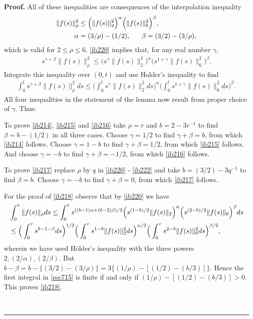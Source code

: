 \documentclass[12pt]{article}
\newenvironment{proof}[1][Proof]{\textbf{#1.} }{\ \rule{0.5em}{0.5em}}
\def \({\Big(}
\def \){\Big)}
\def \eref{\eqref}
\numberwithin{equation}{section}
\begin{document}
\begin{proof}All of these inequalities  are consequences of the interpolation inequality
\begin{align}
&\|f(s)\|_\rho^2  \le \Big(\|f(s)\|_2^2\Big)^\alpha \Big(\| f(s)\|_6^2\Big)^{\beta},  \label{ib220} \\
           &\ \ \ \ \ \ \ \ \alpha = (3/\rho) - (1/2),\ \ \ \ \  \beta = (3/2) - (3/\rho),            \notag
\end{align}
which is valid for $2 \le \rho \le 6$.
\eref{ib220} implies that, for any real number $\gamma$,
\begin{align}
s^{\gamma + \beta} \|f(s)\|_\rho^2 
\le  \Big(s^{\gamma}\|f(s)\|_2^2\Big)^\alpha 
                     \Big(s^{1+\gamma}\| f(s)\|_6^2\Big)^{\beta}.                               \label{ib221}
\end{align}
Integrate this inequality over $(0,t)$ and use Holder's inequality to find
\begin{align}
\int_0^t s^{\gamma + \beta} \|f(s)\|_\rho^2 ds
\le  \Big(\int_0^t s^{\gamma}\|f(s)\|_2^2ds\Big)^\alpha 
               \Big(\int_0^ts^{1+\gamma}\| f(s)\|_6^2ds\Big)^{\beta}.                            \label{ib222}
\end{align}
All four  
 inequalities in the statement of the lemma now result from proper choice of $\gamma$. Thus:

To prove \eref{ib214}, \eref{ib215}  and \eref{ib216} take $\rho =r$ and $b = 2 -3r^{-1}$ to find
 $\beta = b -(1/2)$ in  all three cases.
Choose $\gamma = 1/2$ to find
  $\gamma + \beta = b$, from which \eref{ib214} follows.
 Choose $\gamma = 1-b$ to find $\gamma + \beta =1/2$, from which \eref{ib215} follows.
 And choose $\gamma = -b$ to find  $\gamma + \beta =-1/2$,  from which \eref{ib216} follows.
 
 
        To prove    \eref{ib217}  replace $\rho $ by $q$ in \eref{ib220} - \eref{ib222} and
 take $b =(3/2) - 3q^{-1}$    to find  $\beta = b$.    
Choose  $\gamma = -b$ to find $\gamma + \beta =0$, from which \eref{ib217} follows.

         For the proof of \eref{ib218} observe that by \eref{ib220} we have
\begin{align}
&\int_0^\tau \|f(s)\|_\rho ds \le \int_0^\tau s^{((b-1)\alpha +(b-2)\beta)/2} \(s^{(1-b)/2} \|f(s)\|_2\)^\alpha 
             \(s^{(2-b)/2} \|f(s)\|_6\)^\beta ds                                 \notag\\
  &\le \(\int_0^\tau s^{b-1-\beta} ds \)^{1/2}\(\int_0^\tau s^{1-b} \|f(s)\|_2^2ds\)^{\alpha/2}
         \(\int_0^\tau s^{2-b} \|f(s)\|_6^2ds\)^{\beta/2},        \label{rec715} 
             \end{align}
             wherein we have used   H\"older's inequality with the three powers $2, (2/\alpha), (2/\beta)$.
             But $ b -\beta = b -\{(3/2) - (3/\rho)\}  = 3\{(1/\rho) - [(1/2) - (b/3)]\}$. Hence the first integral in
             \eref{rec715} is finite if and only if $ (1/\rho) - [(1/2) - (b/3)] >0$. This proves \eref{ib218}.
                       

\end{proof}
\end{document}
